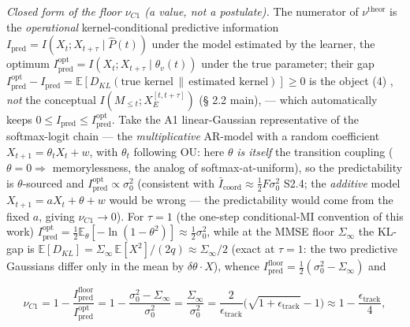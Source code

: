 \documentclass[12pt]{iopart}
\begin{document}
\emph{Closed form of the floor \(\nu_{C1}\) (a value, not a postulate).} The numerator of \(\nu^{\text{theor}}\) is the \emph{operational} kernel-conditional predictive information \(I_{\text{pred}} = I(X_t;X_{t+\tau}\mid\hat P(t))\) under the model estimated by the learner, the optimum \(I_{\text{pred}}^{\text{opt}} = I(X_t;X_{t+\tau}\mid\theta_v(t))\) under the true parameter; their gap \(I_{\text{pred}}^{\text{opt}}-I_{\text{pred}} = \mathbb{E}[D_{KL}(\text{true kernel}\,\|\,\text{estimated kernel})] \ge 0\) is the object (4) \cite{Andriishin2026b}, \emph{not} the conceptual \(I(M_{\le t};X_E^{[t,t+\tau]})\) (§ 2.2 main), --- which automatically keeps \(0 \le I_{\text{pred}} \le I_{\text{pred}}^{\text{opt}}\). Take the A1 linear-Gaussian representative of the softmax-logit chain --- the \emph{multiplicative} AR-model with a random coefficient \(X_{t+1} = \theta_t X_t + w\), with \(\theta_t\) following OU: here \(\theta\) \emph{is itself} the transition coupling (\(\theta = 0 \Rightarrow\) memorylessness, the analog of softmax-at-uniform), so the predictability is \(\theta\)-sourced and \(I_{\text{pred}}^{\text{opt}} \propto \sigma_0^2\) (consistent with \(\bar I_{\text{coord}} \approx \tfrac12 F\sigma_0^2\) \cite{Andriishin2026b} S2.4; the \emph{additive} model \(X_{t+1} = aX_t+\theta+w\) would be wrong --- the predictability would come from the fixed \(a\), giving \(\nu_{C1}\to0\)). For \(\tau = 1\) (the one-step conditional-MI convention of this work) \(I_{\text{pred}}^{\text{opt}} = \tfrac12\mathbb{E}_\theta[-\ln(1-\theta^2)] \approx \tfrac12\sigma_0^2\), while at the MMSE floor \(\Sigma_\infty\) the KL-gap is \(\mathbb{E}[D_{KL}] = \Sigma_\infty\,\mathbb{E}[X^2]/(2q) \approx \Sigma_\infty/2\) (exact at \(\tau = 1\): the two predictive Gaussians differ only in the mean by \(\delta\theta\cdot X\)), whence \(I_{\text{pred}}^{\text{floor}} = \tfrac12(\sigma_0^2-\Sigma_\infty)\) and



\begin{equation}\nu_{C1} = 1 - \frac{I_{\text{pred}}^{\text{floor}}}{I_{\text{pred}}^{\text{opt}}} = 1 - \frac{\sigma_0^2-\Sigma_\infty}{\sigma_0^2} = \frac{\Sigma_\infty}{\sigma_0^2} = \frac{2}{\epsilon_{\text{track}}}\big(\sqrt{1+\epsilon_{\text{track}}}-1\big) \approx 1 - \frac{\epsilon_{\text{track}}}{4}, \tag{S3.3b}\end{equation}
\end{document}
